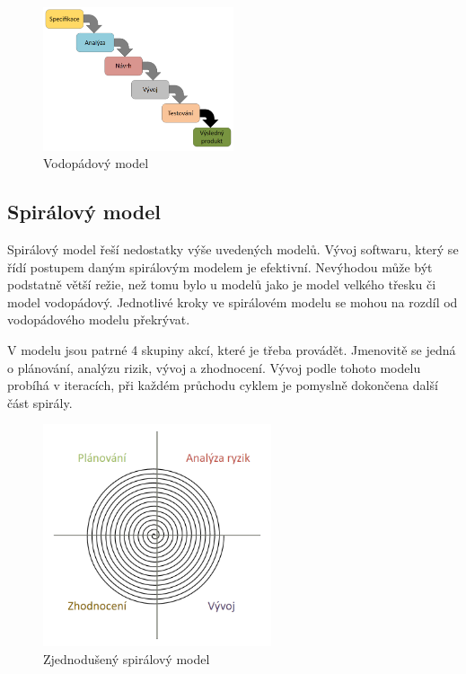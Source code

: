 \begin{figure}[h]
	\centering
	\includegraphics[width=0.5\textwidth]{Figures/vodopad-model.png}
	\caption{Vodopádový model}
	\label{fig:WritingThesis}
\end{figure}

\subsection{Spirálový model}
Spirálový model řeší nedostatky výše uvedených modelů. Vývoj softwaru, který se řídí postupem daným spirálovým modelem je efektivní. Nevýhodou může být podstatně větší režie, než tomu bylo u modelů jako je model velkého třesku či model vodopádový. Jednotlivé kroky ve spirálovém modelu se mohou na rozdíl od vodopádového modelu překrývat.\cite{Patton2002}

V modelu jsou patrné 4 skupiny akcí, které je třeba provádět. Jmenovitě se jedná o plánování, analýzu rizik, vývoj a zhodnocení. Vývoj podle tohoto modelu probíhá v iteracích, při každém průchodu cyklem je pomyslně dokončena další část spirály.



\begin{figure}
	\centering
	\includegraphics[width=0.6\textwidth]{Figures/spiral-model.png}
	\caption{Zjednodušený spirálový model}
	\label{fig:WritingThesis}
\end{figure}

